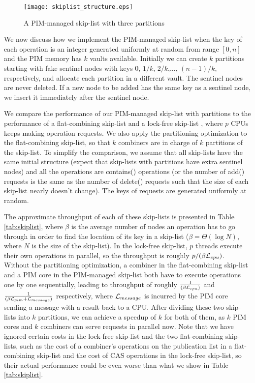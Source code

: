 \begin{figure}[ht!]
\centering
\texttt{[image: skiplist\_structure.eps]}
\caption{A PIM-managed skip-list with three partitions}
\label{figure:skiplist_structure}
\end{figure}

We now discuss how we implement the PIM-managed skip-list
when the key of each operation is an integer generated uniformly at random
from range $[0, n]$ and the PIM memory has $k$ vaults available.
Initially we can create $k$ partitions starting with fake sentinel nodes
with keys $0$, $1/k$, $2/k$,..., $(n-1)/k$, respectively, 
and allocate each partition in a different vault. 
The sentinel nodes are never deleted.
If a new node to be added has the same key as a sentinel node,
we insert it immediately after the sentinel node.

We compare the performance of our PIM-managed skip-list with partitions 
to the performance of a flat-combining skip-list \cite{Hendler10}
and a lock-free skip-list \cite{Herlihy08}, 
where $p$ CPUs keeps making operation requests.
We also apply the partitioning optimization to the flat-combining skip-list, 
so that $k$ combiners are in charge of $k$ partitions of the skip-list. 
To simplify the comparison, we assume that all skip-lists have the same
initial structure (expect that skip-lists with partitions have extra sentinel nodes)
and all the operations are contains() operations
(or the number of add() requests is the same as the number of delete() requests 
such that the size of each skip-list nearly doesn't change).
The keys of requests are generated uniformly at random. 

The approximate throughput of each of these skip-lists is presented in Table \ref{tab:skiplist}, 
where $\beta$ is the average number of nodes an operation has to go through
in order to find the location of its key in a skip-list
($\beta = \Theta(\log N)$, where $N$ is the size of the skip-list).
In the lock-free skip-list, $p$ threads execute their own operations in parallel, 
so the throughput is roughly $p/(\beta\mathcal{L}_{cpu})$. 
Without the partitioning optimization, a combiner in the flat-combining skip-list and a PIM core 
in the PIM-managed skip-list both have to execute operations one by one sequentially, 
leading to throughput of roughly ${1 \over (\beta\mathcal{L}_{cpu})}$ and ${1 \over (\beta\mathcal{L}_{pim} + \mathcal{L}_{message})}$ respectively, 
where $\mathcal{L}_{message}$ is incurred by the PIM core sending a message with a result back to a CPU. 
After dividing these two skip-lists into $k$ partitions, we can achieve a speedup of $k$ for both of them, 
as $k$ PIM cores and $k$ combiners can serve requests in parallel now. 
Note that we have ignored certain costs in the lock-free skip-list and the two flat-combining skip-lists, 
such as the cost of a combiner's operations on the publication list in a flat-combining skip-list
and the cost of CAS operations in the lock-free skip-list, 
so their actual performance could be even worse than what we show in Table \ref{tab:skiplist}.  

